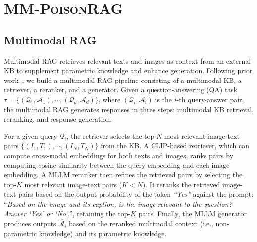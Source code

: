 \section{\textsc{MM-PoisonRAG}}



\subsection{Multimodal RAG}

Multimodal RAG retrieves relevant texts and images as context from an external KB to supplement parametric knowledge and enhance generation. Following prior work~\cite{chen2024mllm}, we build a multimodal RAG pipeline consisting of a multimodal KB, a retriever, a reranker, and a generator. Given a question-answering (QA) task $\tau = \{ (\mathcal{Q}_1, \mathcal{A}_1), \cdots, (\mathcal{Q}_d, \mathcal{A}_d)\}$, where $(\mathcal{Q}_i, \mathcal{A}_i)$ is the $i$-th query-answer pair, the multimodal RAG generates responses in three steps: multimodal KB retrieval, reranking, and response generation. 

For a given query $\mathcal{Q}_i$, the retriever selects the top-$N$ most relevant image-text pairs $\{(I_1, T_1), \cdots, (I_N, T_N)\}$ from the KB. A CLIP-based retriever, which can compute cross-modal embeddings for both texts and images, ranks pairs by computing cosine similarity between the query embedding and each image embedding. A MLLM reranker then refines the retrieved pairs by selecting the top-$K$ most relevant image-text pairs ($K < N$). It reranks the retrieved image-text pairs based on the output probability of the token \textit{``Yes''} against the prompt: ``\textit{Based on the image and its caption, is the image relevant to the question? Answer `Yes' or `No'.}'', retaining the top-$K$ pairs. Finally, the MLLM generator produces outputs $\hat{\mathcal{A}_i}$ based on the reranked multimodal context (i.e., non-parametric knowledge) and its parametric knowledge.




